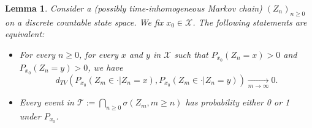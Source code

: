 \documentclass[12pt,a4paper]{article}
\newtheorem{lemma}[theo]{Lemma}
\newcommand{\1}[1]{{\mathbf 1}{\{#1\}}}
\newcommand{\8}{{\infty}}
\begin{document}
\begin{lemma}\label{lem:general_equiv_01law}
Consider a (possibly time-inhomogeneous Markov chain) $(Z_n)_{n\ge 0}$ on a discrete countable state space. We fix $x_0\in \mathcal{X}$. The following statements are equivalent:
\begin{itemize}
  \item[(i)] For every $n\ge 0$, for every $x$ and $y$ in $\mathcal{X}$ such that $P_{x_0}(Z_n =x)>0$ and $P_{x_0}(Z_n =y)>0$, we have
  \begin{equation}
  d_{TV}(P_{x_0}(Z_m \in \cdot | Z_n = x), P_{x_0}(Z_m \in \cdot | Z_n = y))  \underset{m\to\infty}{\longrightarrow} 0.
  \end{equation}
  \item[(ii)] Every event in $\mathcal{T}:=\bigcap_{n\ge 0} \sigma(Z_m , m \ge n)$ has probability either 0 or 1 under $P_{x_0}$.
\end{itemize} 
\end{lemma}
\end{document}
